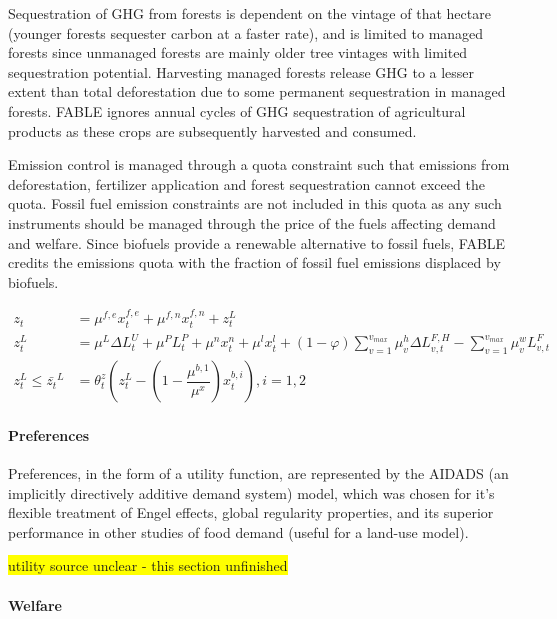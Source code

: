 \documentclass[10pt]{article}
\newcommand{\hilight}[1]{\colorbox{yellow}{#1}}
\begin{document}
Sequestration of GHG from forests is dependent on the vintage of that hectare (younger forests sequester carbon at a faster rate), and is limited to managed forests since unmanaged forests are mainly older tree vintages with limited sequestration potential. Harvesting managed forests release GHG  to a lesser extent than total deforestation due to some permanent sequestration in managed forests. FABLE ignores annual cycles of GHG sequestration of agricultural products as these crops are subsequently harvested and consumed. 

Emission control is managed through a quota constraint such that emissions from deforestation, fertilizer application and forest sequestration cannot exceed the quota. Fossil fuel emission constraints are not included in this quota as any such instruments should be managed through the price of the fuels affecting demand and welfare. Since biofuels provide a renewable alternative to fossil fuels, FABLE credits the emissions quota with the fraction of fossil fuel emissions displaced by biofuels. 

\begin{subequations}
\begin{align}
z_t &= \mu^{f,e} x_t^{f,e} + \mu^{f,n} x_t^{f,n} + z_t^L \\
z_t^L &= \mu^L \Delta L_t^U + \mu^P L_t^P + \mu^n x_t^n + \mu^l x_t^l + (1 - \varphi)\sum \limits_{v=1}^{v_{max}} \mu^h_v \Delta L_{v,t}^{F,H} - \sum \limits_{v=1}^{v_{max}} \mu_v^w L_{v,t}^F \\
z_t^L \leq \bar{z_t}^L &= \theta_t^z \left ( z_t^L - \left ( 1 - \dfrac{\mu^{b,1}}{\mu^x} \right ) x_t^{b,i} \right ) , i = 1, 2
\end{align}
\end{subequations}


\paragraph{Preferences}

Preferences, in the form of a utility function, are represented by the AIDADS (an implicitly directively additive demand system) model, which was chosen for it's flexible treatment of Engel effects, global regularity properties, and its superior performance in other studies of food demand (useful for a land-use model).


\hilight{utility source unclear - this section unfinished}

\paragraph{Welfare}
\end{document}
